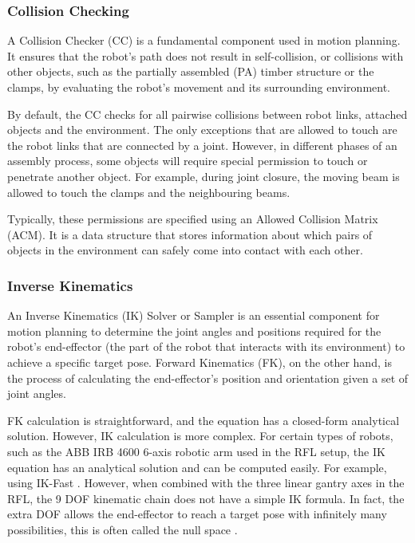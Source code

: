 \subsubsection{Collision Checking}
\label{subsubsection:exploration-2-collision-checking}

A Collision Checker (CC) is a fundamental component used in motion planning. It ensures that the robot's path does not result in self-collision, or collisions with other objects, such as the partially assembled (PA) timber structure or the clamps, by evaluating the robot's movement and its surrounding environment. 

By default, the CC checks for all pairwise collisions between robot links, attached objects and the environment. The only exceptions that are allowed to touch are the robot links that are connected by a joint. However, in different phases of an assembly process, some objects will require special permission to touch or penetrate another object. For example, during joint closure, the moving beam is allowed to touch the clamps and the neighbouring beams. 

Typically, these permissions are specified using an Allowed Collision Matrix (ACM). It is a data structure that stores information about which pairs of objects in the environment can safely come into contact with each other.

\subsubsection{Inverse Kinematics}
\label{subsubsection:exploration-2-inverse-kinematics}

An Inverse Kinematics (IK) Solver or Sampler is an essential component for motion planning to determine the joint angles and positions required for the robot's end-effector (the part of the robot that interacts with its environment) to achieve a specific target pose. Forward Kinematics (FK), on the other hand, is the process of calculating the end-effector's position and orientation given a set of joint angles.

FK calculation is straightforward, and the equation has a closed-form analytical solution. However, IK calculation is more complex. For certain types of robots, such as the ABB IRB 4600 6-axis robotic arm used in the RFL setup, the IK equation has an analytical solution and can be computed easily. For example, using IK-Fast \parencite{diankovOpenRAVEPlanningArchitecture2008}. However, when combined with the three linear gantry axes in the RFL, the 9 DOF kinematic chain does not have a simple IK formula. In fact, the extra DOF allows the end-effector to reach a target pose with infinitely many possibilities, this is often called the null space \parencite{craigIntroductionRobotics2006}.


